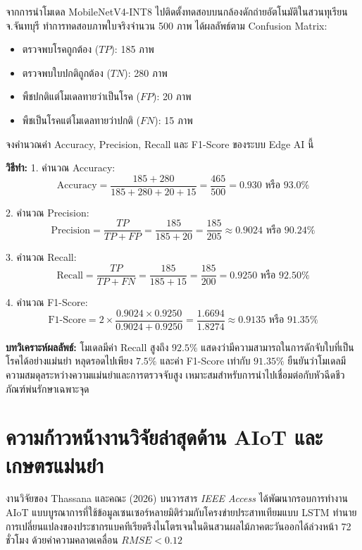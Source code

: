 \begin{worked}
จากการนำโมเดล MobileNetV4-INT8 ไปติดตั้งทดสอบบนกล้องดักถ่ายอัตโนมัติในสวนทุเรียน จ.จันทบุรี ทำการทดสอบภาพใบจริงจำนวน 500 ภาพ ได้ผลลัพธ์ตาม Confusion Matrix:
\begin{itemize}
    \item ตรวจพบโรคถูกต้อง ($TP$): 185 ภาพ
    \item ตรวจพบใบปกติถูกต้อง ($TN$): 280 ภาพ
    \item พืชปกติแต่โมเดลทายว่าเป็นโรค ($FP$): 20 ภาพ
    \item พืชเป็นโรคแต่โมเดลทายว่าปกติ ($FN$): 15 ภาพ
\end{itemize}
จงคำนวณค่า Accuracy, Precision, Recall และ F1-Score ของระบบ Edge AI นี้

\textbf{วิธีทำ:}
1. คำนวณ Accuracy:
$$\text{Accuracy} = \frac{185 + 280}{185 + 280 + 20 + 15} = \frac{465}{500} = 0.930 \text{ หรือ } \mathbf{93.0\%}$$

2. คำนวณ Precision:
$$\text{Precision} = \frac{TP}{TP + FP} = \frac{185}{185 + 20} = \frac{185}{205} \approx 0.9024 \text{ หรือ } \mathbf{90.24\%}$$

3. คำนวณ Recall:
$$\text{Recall} = \frac{TP}{TP + FN} = \frac{185}{185 + 15} = \frac{185}{200} = 0.9250 \text{ หรือ } \mathbf{92.50\%}$$

4. คำนวณ F1-Score:
$$\text{F1-Score} = 2 \times \frac{0.9024 \times 0.9250}{0.9024 + 0.9250} = \frac{1.6694}{1.8274} \approx 0.9135 \text{ หรือ } \mathbf{91.35\%}$$

\textbf{บทวิเคราะห์ผลลัพธ์:} โมเดลมีค่า Recall สูงถึง $92.5\%$ แสดงว่ามีความสามารถในการดักจับใบที่เป็นโรคได้อย่างแม่นยำ หลุดรอดไปเพียง $7.5\%$ และค่า F1-Score เท่ากับ $91.35\%$ ยืนยันว่าโมเดลมีความสมดุลระหว่างความแม่นยำและการตรวจจับสูง เหมาะสมสำหรับการนำไปเชื่อมต่อกับหัวฉีดชีวภัณฑ์พ่นรักษาเฉพาะจุด
\end{worked}

\section{ความก้าวหน้างานวิจัยล่าสุดด้าน AIoT และเกษตรแม่นยำ}

งานวิจัยของ Thassana และคณะ (2026) \cite{thassana_2026} บนวารสาร \textit{IEEE Access} ได้พัฒนากรอบการทำงาน AIoT แบบบูรณาการที่ใช้ข้อมูลเซนเซอร์หลายมิติร่วมกับโครงข่ายประสาทเทียมแบบ LSTM ทำนายการเปลี่ยนแปลงของประชากรแบคทีเรียตรึงไนโตรเจนในดินสวนผลไม้ภาคตะวันออกได้ล่วงหน้า 72 ชั่วโมง ด้วยค่าความคลาดเคลื่อน $RMSE < 0.12$

